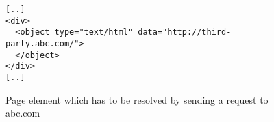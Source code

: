\begin{figure}
\begin{verbatim}
[..]
<div> 
  <object type="text/html" data="http://third-party.abc.com/">
  </object>
</div>
[..]
\end{verbatim}
\caption{Page element which has to be resolved by sending a request to abc.com}\label{fig:third-party-content}
\end{figure}
